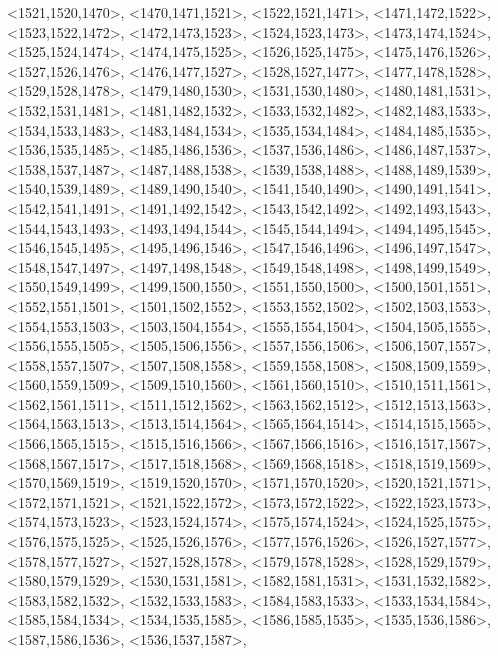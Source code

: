 \documentclass[a4paper,10pt]{article}
\begin{document}
\begin{eulernotebook}
\begin{euleroutput}
  <1521,1520,1470>,
  <1470,1471,1521>,
  <1522,1521,1471>,
  <1471,1472,1522>,
  <1523,1522,1472>,
  <1472,1473,1523>,
  <1524,1523,1473>,
  <1473,1474,1524>,
  <1525,1524,1474>,
  <1474,1475,1525>,
  <1526,1525,1475>,
  <1475,1476,1526>,
  <1527,1526,1476>,
  <1476,1477,1527>,
  <1528,1527,1477>,
  <1477,1478,1528>,
  <1529,1528,1478>,
  <1479,1480,1530>,
  <1531,1530,1480>,
  <1480,1481,1531>,
  <1532,1531,1481>,
  <1481,1482,1532>,
  <1533,1532,1482>,
  <1482,1483,1533>,
  <1534,1533,1483>,
  <1483,1484,1534>,
  <1535,1534,1484>,
  <1484,1485,1535>,
  <1536,1535,1485>,
  <1485,1486,1536>,
  <1537,1536,1486>,
  <1486,1487,1537>,
  <1538,1537,1487>,
  <1487,1488,1538>,
  <1539,1538,1488>,
  <1488,1489,1539>,
  <1540,1539,1489>,
  <1489,1490,1540>,
  <1541,1540,1490>,
  <1490,1491,1541>,
  <1542,1541,1491>,
  <1491,1492,1542>,
  <1543,1542,1492>,
  <1492,1493,1543>,
  <1544,1543,1493>,
  <1493,1494,1544>,
  <1545,1544,1494>,
  <1494,1495,1545>,
  <1546,1545,1495>,
  <1495,1496,1546>,
  <1547,1546,1496>,
  <1496,1497,1547>,
  <1548,1547,1497>,
  <1497,1498,1548>,
  <1549,1548,1498>,
  <1498,1499,1549>,
  <1550,1549,1499>,
  <1499,1500,1550>,
  <1551,1550,1500>,
  <1500,1501,1551>,
  <1552,1551,1501>,
  <1501,1502,1552>,
  <1553,1552,1502>,
  <1502,1503,1553>,
  <1554,1553,1503>,
  <1503,1504,1554>,
  <1555,1554,1504>,
  <1504,1505,1555>,
  <1556,1555,1505>,
  <1505,1506,1556>,
  <1557,1556,1506>,
  <1506,1507,1557>,
  <1558,1557,1507>,
  <1507,1508,1558>,
  <1559,1558,1508>,
  <1508,1509,1559>,
  <1560,1559,1509>,
  <1509,1510,1560>,
  <1561,1560,1510>,
  <1510,1511,1561>,
  <1562,1561,1511>,
  <1511,1512,1562>,
  <1563,1562,1512>,
  <1512,1513,1563>,
  <1564,1563,1513>,
  <1513,1514,1564>,
  <1565,1564,1514>,
  <1514,1515,1565>,
  <1566,1565,1515>,
  <1515,1516,1566>,
  <1567,1566,1516>,
  <1516,1517,1567>,
  <1568,1567,1517>,
  <1517,1518,1568>,
  <1569,1568,1518>,
  <1518,1519,1569>,
  <1570,1569,1519>,
  <1519,1520,1570>,
  <1571,1570,1520>,
  <1520,1521,1571>,
  <1572,1571,1521>,
  <1521,1522,1572>,
  <1573,1572,1522>,
  <1522,1523,1573>,
  <1574,1573,1523>,
  <1523,1524,1574>,
  <1575,1574,1524>,
  <1524,1525,1575>,
  <1576,1575,1525>,
  <1525,1526,1576>,
  <1577,1576,1526>,
  <1526,1527,1577>,
  <1578,1577,1527>,
  <1527,1528,1578>,
  <1579,1578,1528>,
  <1528,1529,1579>,
  <1580,1579,1529>,
  <1530,1531,1581>,
  <1582,1581,1531>,
  <1531,1532,1582>,
  <1583,1582,1532>,
  <1532,1533,1583>,
  <1584,1583,1533>,
  <1533,1534,1584>,
  <1585,1584,1534>,
  <1534,1535,1585>,
  <1586,1585,1535>,
  <1535,1536,1586>,
  <1587,1586,1536>,
  <1536,1537,1587>,

\end{euleroutput}
\end{eulernotebook}
\end{document}

